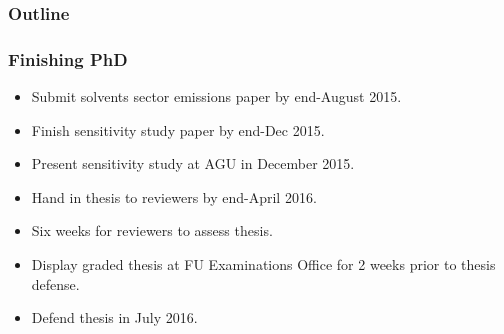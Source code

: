 \begin{frame}
    \frametitle{Outline} 
    \tableofcontents[currentsection]
\end{frame} 

\begin{frame}
    \frametitle{Finishing PhD}

    \vspace{-7mm}
    \begin{itemize}
        \item Submit solvents sector emissions paper by end-August 2015. \vspace{2mm}
        \item Finish sensitivity study paper by end-Dec 2015. \vspace{2mm}
        \item Present sensitivity study at AGU in December 2015. \vspace{2mm}
        \item Hand in thesis to reviewers by end-April 2016. \vspace{2mm}
        \item Six weeks for reviewers to assess thesis. \vspace{2mm}
        \item Display graded thesis at FU Examinations Office for 2 weeks prior to thesis defense. \vspace{2mm}
        \item Defend thesis in July 2016.
    \end{itemize}
\end{frame}
